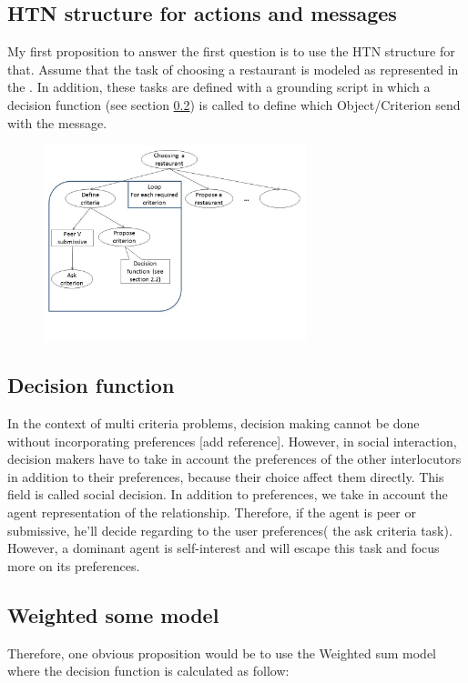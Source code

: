 \documentclass{llncs}
\begin{document}
\subsection{HTN structure for actions and messages}
My first proposition to answer the first question is to use the HTN structure for that. Assume that the task of choosing a restaurant is modeled as represented in the  . In addition, these tasks are defined with a grounding script in which a decision function (see section \ref{DF}) is called to define which Object/Criterion send with the message. 

\begin{figure}[b]
	\centerline{\includegraphics[width=3in]{figs/dialogue_tree}}
	\vskip 8pt
\end{figure}


\subsection{Decision function} \label{DF}
In the context of multi criteria problems, decision making cannot be done without incorporating preferences [add reference]. However, in social interaction, decision makers have to take in account the preferences of the other interlocutors in addition to their preferences, because their choice affect them directly. This field is called social decision. In addition to preferences, we take in account the agent representation of the relationship. Therefore, if the agent is peer or submissive, he'll decide regarding to the user preferences( the ask criteria task). However, a dominant agent is self-interest and will escape this task and focus more on its preferences. 
\subsection{Weighted some model}
\par Therefore, one obvious proposition would be to use the Weighted sum model where the decision function is calculated as follow:
\end{document}
